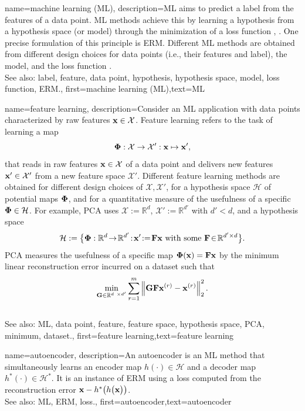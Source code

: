 {name={machine learning (ML)},
		 description={ML aims to predict 
	 a label from the features of a data point. ML methods achieve 
	 this by learning a hypothesis from a hypothesis space (or model) 
	 through the minimization of a loss function \cite{MLBasics}, \cite{HastieWainwrightBook}. 
	 One precise formulation of this principle is ERM. Different ML methods are 
	 obtained from different design choices for data points (i.e., their features and label), 
	 the model, and the loss function \cite[Ch. 3]{MLBasics}.
	 			\\ 
		See also: label, feature, data point, hypothesis, hypothesis space, model, loss function, ERM.},
	first={machine learning (ML)},text={ML}
} 


{name={feature learning},
	description={Consider an ML application with data points characterized by 
		raw features ${\bf x} \in \mathcal{X}$. Feature learning 
		refers to the task of learning a map 
		$${\bf \Phi}: \mathcal{X} \rightarrow \mathcal{X}': {\bf x} \mapsto {\bf x}',$$ 
		that reads in raw features ${\bf x} \in \mathcal{X}$ of a data point and delivers new 
		features ${\bf x}' \in \mathcal{X}'$ from a new feature space $\mathcal{X}'$. 
		Different feature learning methods are obtained for different design 
		choices of $\mathcal{X},\mathcal{X}'$, for a hypothesis space $\mathcal{H}$ 
		of potential maps ${\bf \Phi}$, and for a quantitative measure of the usefulness of 
		a specific ${\bf \Phi} \in \mathcal{H}$. For example, PCA 
		uses $\mathcal{X} := \mathbb{R}^{d}$, $\mathcal{X}' := \mathbb{R}^{d'}$ 
		with $d' < d$, and a hypothesis space 
		$$\mathcal{H}:= \big\{ {\bf \Phi}: \mathbb{R}^{d}
		\!\rightarrow\! \mathbb{R}^{d'}\!:\!{\bf x}'\!:=\!\mathbf{F} {\bf x} \mbox{ with some } \mathbf{F} \!\in\! \mathbb{R}^{d' \times d} \big\}.$$ PCA measures the usefulness of a specific map ${\bf \Phi}({\bf x})= \mathbf{F} {\bf x}$ 
	by the minimum linear reconstruction error incurred on a dataset such that 
$$ \min_{\mathbf{G} \in \mathbb{R}^{d \times d'}} \sum_{r=1}^{m} \left\Vert  {\mathbf{G} \mathbf{F} {\bf x}^{(r)} - {\bf x}^{(r)}} \right\Vert_{2}^{2}.$$ 
			\\ 
		See also: ML, data point, feature, feature space, hypothesis space, PCA, minimum, dataset.}, 
	first={feature learning},text={feature learning}
} 

{name={autoencoder},
	description={An autoencoder is an ML method that simultaneously learns an encoder map 
		$h(\cdot) \in \mathcal{H}$ and a decoder map $h^{*}(\cdot) \in \mathcal{H}^{*}$. 
		It is an instance of ERM using a loss computed from the reconstruction error 
		${\bf x} - h^{*}\big(  h \big( {\bf x} \big) \big)$.
					\\ 
		See also: ML, ERM, loss.},
	first={autoencoder},text={autoencoder}
} 

